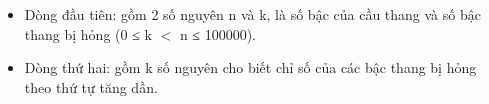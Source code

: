 \begin{itemize}
	\item Dòng đầu tiên: gồm 2 số nguyên n và k, là số bậc của cầu thang và số bậc thang bị hỏng (0 ≤ k $<$ n ≤ 100000).
	\item Dòng thứ hai: gồm k số nguyên cho biết chỉ số của các bậc thang bị hỏng theo thứ tự tăng dần.
\end{itemize}

\